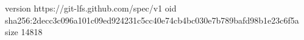 version https://git-lfs.github.com/spec/v1
oid sha256:2decc3c096a101c09ed924231c5cc40e74cb4bc030e7b789bafd98b1e23c6f5a
size 14818
